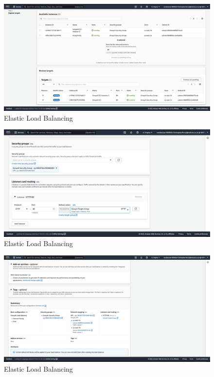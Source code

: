 \begin{figure}[!htbp]
    \centering
    \includegraphics[width=\textwidth]{resources/elb/elb-register-targets.png}
    \caption{Elastic Load Balancing}
    \label{fig:elb-register-targets}
\end{figure}
\begin{figure}[!htbp]
    \centering
    \includegraphics[width=\textwidth]{resources/elb/elb-security-groups-and-listeners.png}
    \caption{Elastic Load Balancing}
    \label{fig:elb-security-groups}
\end{figure}
\begin{figure}[!htbp]
    \centering
    \includegraphics[width=\textwidth]{resources/elb/elb-summary.png}
    \caption{Elastic Load Balancing}
    \label{fig:elb-summary}
\end{figure}
